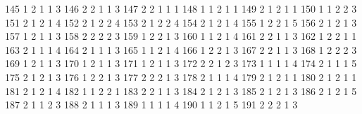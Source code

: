 \documentclass[
  letterpaper,
  DIV=11,
  numbers=noendperiod]{scrreprt}
\newenvironment{Shaded}{\begin{snugshade}}{\end{snugshade}}
\newcommand{\NormalTok}[1]{\textcolor[rgb]{0.00,0.23,0.31}{#1}}
\begin{document}
\begin{Shaded}
\begin{Highlighting}[]
\NormalTok{145         1         2     1    1        3}
\NormalTok{146         2         2     1    1        3}
\NormalTok{147         2         2     1    1        1}
\NormalTok{148         1         1     2    1        1}
\NormalTok{149         2         1     2    1        1}
\NormalTok{150         1         1     2    2        3}
\NormalTok{151         2         1     2    1        4}
\NormalTok{152         2         1     2    2        4}
\NormalTok{153         2         1     2    2        4}
\NormalTok{154         2         1     2    1        4}
\NormalTok{155         1         2     2    1        5}
\NormalTok{156         2         1     2    1        3}
\NormalTok{157         1         2     1    1        3}
\NormalTok{158         2         2     2    2        3}
\NormalTok{159         1         2     2    1        3}
\NormalTok{160         1         1     2    1        4}
\NormalTok{161         2         2     1    1        3}
\NormalTok{162         1         2     2    1        1}
\NormalTok{163         2         1     1    1        4}
\NormalTok{164         2         1     1    1        3}
\NormalTok{165         1         1     2    1        4}
\NormalTok{166         1         2     2    1        3}
\NormalTok{167         2         2     1    1        3}
\NormalTok{168         1         2     2    2        3}
\NormalTok{169         1         2     1    1        3}
\NormalTok{170         1         2     1    1        3}
\NormalTok{171         1         2     1    1        3}
\NormalTok{172         2         2     1    2        3}
\NormalTok{173         1         1     1    1        4}
\NormalTok{174         2         1     1    1        5}
\NormalTok{175         2         1     2    1        3}
\NormalTok{176         1         2     2    1        3}
\NormalTok{177         2         2     2    1        3}
\NormalTok{178         2         1     1    1        4}
\NormalTok{179         2         1     2    1        1}
\NormalTok{180         2         1     2    1        1}
\NormalTok{181         2         1     2    1        4}
\NormalTok{182         1         1     2    2        1}
\NormalTok{183         2         2     1    1        3}
\NormalTok{184         2         1     2    1        3}
\NormalTok{185         2         1     2    1        3}
\NormalTok{186         2         1     2    1        5}
\NormalTok{187         2         1     1    2        3}
\NormalTok{188         2         1     1    1        3}
\NormalTok{189         1         1     1    1        4}
\NormalTok{190         1         1     2    1        5}
\NormalTok{191         2         2     2    1        3}

\end{Highlighting}
\end{Shaded}
\end{document}

